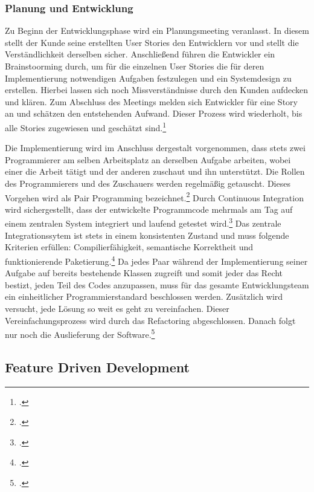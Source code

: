 \subsubsection{Planung und Entwicklung}
Zu Beginn der Entwicklungsphase wird ein Planungsmeeting veranlasst. In diesem stellt der Kunde seine erstellten User Stories den Entwicklern vor und stellt die Verständlichkeit derselben sicher. Anschließend führen die Entwickler ein Brainstoorming durch, um für die einzelnen User Stories die für deren Implementierung notwendigen Aufgaben festzulegen und ein Systemdesign zu erstellen. Hierbei lassen sich noch Missverständnisse durch den Kunden aufdecken und klären. Zum Abschluss des Meetings melden sich Entwickler für eine Story an und schätzen den entstehenden Aufwand. Dieser Prozess wird wiederholt, bis alle Stories zugewiesen und geschätzt sind.\footcite[Vgl.][Seite 63 f.]{extreme}

Die Implementierung wird im Anschluss dergestalt vorgenommen, dass stets zwei Programmierer am selben Arbeitsplatz an derselben Aufgabe arbeiten, wobei einer die Arbeit tätigt und der anderen zuschaut und ihn unterstützt. Die Rollen des Programmierers und des Zuschauers werden regelmäßig getauscht. Dieses Vorgehen wird als Pair Programming bezeichnet.\footcite[Vgl.][Seite 72]{extreme} Durch Continuous Integration wird sichergestellt, dass der entwickelte Programmcode mehrmals am Tag auf einem zentralen System integriert und laufend getestet wird.\footcite[Vgl.][Seite 78]{extreme} Das zentrale Integrationssytem ist stets in einem konsistenten Zustand und muss folgende Kriterien erfüllen: Compilierfähigkeit, semantische Korrektheit und funktionierende Paketierung.\footcite[Vgl.][Seite 22]{pichler} Da jedes Paar während der Implementierung seiner Aufgabe auf bereits bestehende Klassen zugreift und somit jeder das Recht bestizt, jeden Teil des Codes anzupassen, muss für das gesamte Entwicklungsteam ein einheitlicher Programmierstandard beschlossen werden. Zusätzlich wird versucht, jede Lösung so weit es geht zu vereinfachen. Dieser Vereinfachungsprozess wird durch das Refactoring abgeschlossen. Danach folgt nur noch die Auslieferung der Software.\footcite[Vgl.][Seite 72 ff.]{extreme}

\subsection{Feature Driven Development}

